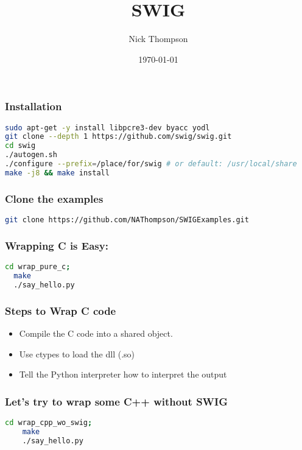 \documentclass{beamer}
\begin{document}
\title{SWIG}
\author{Nick Thompson} 
\date{\today} 

\frame{\titlepage} 


\begin{frame}[fragile]
\frametitle{Installation}

\begin{lstlisting}[language=bash]
sudo apt-get -y install libpcre3-dev byacc yodl
git clone --depth 1 https://github.com/swig/swig.git
cd swig
./autogen.sh
./configure --prefix=/place/for/swig # or default: /usr/local/share
make -j8 && make install
\end{lstlisting}
\end{frame}

\begin{frame}[fragile]
  \frametitle{Clone the examples}
  \begin{lstlisting}[language=bash]
    git clone https://github.com/NAThompson/SWIGExamples.git
  \end{lstlisting}
\end{frame}

\begin{frame}[fragile]
\frametitle{Wrapping C is Easy:}
\begin{lstlisting}[language=bash]
  cd wrap_pure_c;
  make
  ./say_hello.py
\end{lstlisting}
\end{frame}

\begin{frame}[fragile]
  \frametitle{Steps to Wrap C code}
  \begin{itemize}
  \item Compile the C code into a shared object.
  \item Use ctypes to load the dll (.so)
  \item Tell the Python interpreter how to interpret the output
  \end{itemize}
\end{frame}


\begin{frame}[fragile]
  \frametitle{Let's try to wrap some C++ without SWIG}
  \begin{lstlisting}[language=bash]
    cd wrap_cpp_wo_swig;
    make
    ./say_hello.py
  \end{lstlisting}
  
\end{frame}
\end{document}
